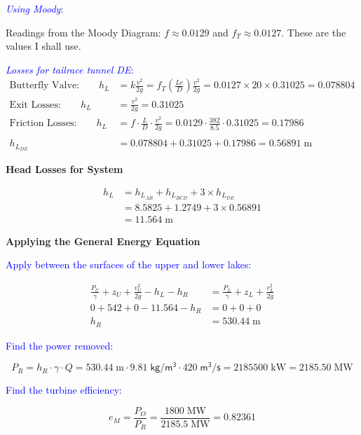 \documentclass[10pt]{amsart}
\begin{document}
\textcolor{blue}{\em Using Moody}:

Readings from the Moody Diagram: $f\approx 0.0129$ and $f_T\approx 0.0127$. These are the
values I shall use.

\textcolor{blue}{\em Losses for tailrace tunnel DE}:
\begin{align*}
	\text{Butterfly Valve:}\qquad h_{L} & = k\frac{v^2}{2g} =
	f_T\left(\frac{Le}{D}\right)\frac{v^2}{2g}=0.0127\times 20\times 0.31025 = 0.078804\\
	\text{Exit Losses:}\qquad h_{L}     & =  \frac{v^2}{2g} = 0.31025                    \\
	\text{Friction Losses:}\qquad h_{L} & = f\cdot\frac{L}{D} \cdot\frac{v^2}{2g} =
	0.0129\cdot\frac{382}{8.5}\cdot0.31025 = 0.17986
	\\\\
	h_{L_{DE}}                          & = 0.078804+0.31025+0.17986 = 0.56891\;\text{m}
\end{align*}

\textbf{Head Losses for System}

\begin{align*}
	h_L & = h_{L_{AB}}+h_{L_{BCD}}+3\times h_{L_{DE}} \\
	    & = 8.5825+1.2749+3\times0.56891              \\
	    & = 11.564\;\text{m}
\end{align*}

\textbf{Applying the General Energy Equation}

\textcolor{blue}{Apply between the surfaces of the upper and lower lakes}:

\begin{align*}
	\frac{P_U}{\gamma}+z_U+\frac{v_U^2}{2g}-h_L-h_R & = \frac{P_L}{\gamma}+z_L+\frac{v_L^2}{2g} \\
	0+542+0-11.564-h_R                              & = 0+0+0                                   \\
	h_R                                             & = 530.44\;\text{m}
\end{align*}

\textcolor{blue}{Find the power removed}:

\[ P_R = h_R \cdot \gamma \cdot Q = 530.44\; \text{m}\cdot9.81\; \mathsf{kg/m^3}\cdot420\; \mathsf{m^3/s} =
	2185500\;\text{kW}=2185.50\;\text{MW}\]

	\textcolor{blue}{Find the turbine efficiency}:

	\[ e_M = \frac{P_O}{P_R} = \frac{1800\;\text{MW}}{2185.5\;\text{MW}}= 0.82361 \]
\end{document}
